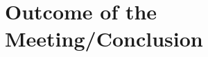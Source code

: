 \section{Outcome of the Meeting/Conclusion}



\begin{thebibliography}{}





\end{thebibliography}



